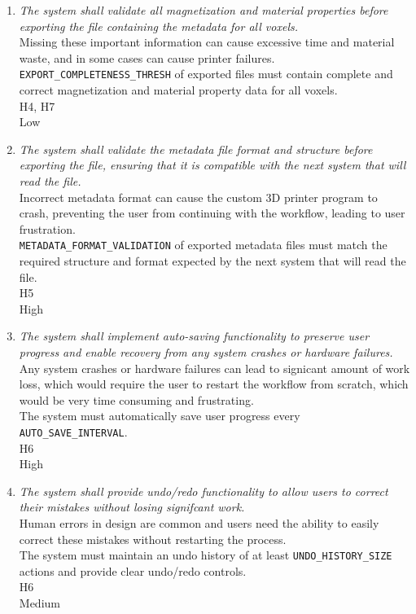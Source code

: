 \documentclass{article}
\begin{document}
\begin{enumerate}
\item \hypertarget{scr4}{}\emph{The system shall validate all magnetization and material properties before exporting the file containing the metadata for all voxels.}\\
     Missing these important information can cause excessive time and material waste, and in some cases can cause printer failures.\\
     \texttt{EXPORT\_COMPLETENESS\_THRESH} of exported files must contain complete and correct magnetization and material property data for all voxels.\\
     H4, H7\\
     Low

\item \hypertarget{scr5}{}\emph{The system shall validate the metadata file format and structure before exporting the file, ensuring that it is compatible with the next system that will read the file.}\\
     Incorrect metadata format can cause the custom 3D printer program to crash, preventing the user from continuing with the workflow, leading to user frustration.\\
     \texttt{METADATA\_FORMAT\_VALIDATION} of exported metadata files must match the required structure and format expected by the next system that will read the file.\\
     H5\\
     High

\item \hypertarget{scr6}{}\emph{The system shall implement auto-saving functionality to preserve user progress and enable recovery from any system crashes or hardware failures.}\\
     Any system crashes or hardware failures can lead to signicant amount of work loss, which would require the user to restart the workflow from scratch, which would be very time consuming and frustrating.\\
     The system must automatically save user progress every \texttt{AUTO\_SAVE\_INTERVAL}.\\
     H6\\
     High

\item \hypertarget{scr7}{}\emph{The system shall provide undo/redo functionality to allow users to correct their mistakes without losing signifcant work.}\\
     Human errors in design are common and users need the ability to easily correct these mistakes without restarting the process.\\
     The system must maintain an undo history of at least \texttt{UNDO\_HISTORY\_SIZE} actions and provide clear undo/redo controls.\\
     H6\\
     Medium


\end{enumerate}
\end{document}
